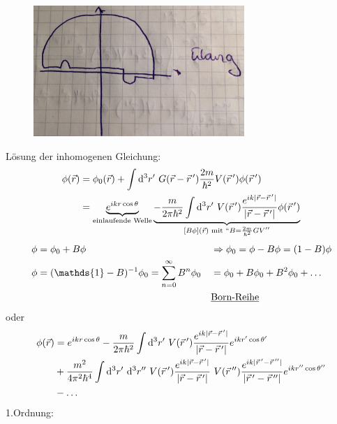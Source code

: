 	\begin{figure} [h]
		\begin{center}
			\includegraphics[width=8cm]{Born_Naeherung}
		\end{center}
	\end{figure}
	Lösung der inhomogenen Gleichung:
		\begin{align*}
			\phi(\vec{r}) &= \phi_0 (\vec{r}) + 
			\int \diff^3 r' ~G(\vec{r} - \vec{r}\,') \frac{2m}{\hbar^2} V(\vec{r}\,') \phi (\vec{r}\,') \\
			&= \underbrace{e^{ikr \cos \theta}}_{\substack{\text{einlaufende Welle}}}
			\underbrace{- \frac{m}{2 \pi \hbar^2} \int \diff^3 r' ~V(\vec{r}\,') 
			\frac{e^{ik |\vec{r} - \vec{r}\,'|}}{|\vec{r} - \vec{r}\,'|} \phi (\vec{r}\,')}_{\mathclap{[
				B\phi] (\vec{r}) \text{ mit } ``B=\frac{2m}{\hbar^2} GV''}} 
		\end{align*}
		\begin{align*}
			\phi &= \phi_0 + B \phi &
			&\Rightarrow \phi_0 = \phi - B \phi = (1 - B) \phi \\
			\phi &= (\mathds{1} - B)^{-1} \phi_0 = \sum_{n = 0}^{\infty} B^n \phi_0 &
			&= \phi_0 + B \phi_0 + B^2 \phi_0 + \ldots \\
			& & &\text{\underline{Born-Reihe}}
		\end{align*}
	oder
		\begin{align*}
			\phi (\vec{r}) &= e^{ikr \cos \theta}
			- \frac{m}{2 \pi \hbar^2} \int \mathrm{d}^3 r' ~V(\vec{r}\,') 
			\frac{e^{ik |\vec{r} - \vec{r}\,'|}}{|\vec{r} - \vec{r}\,'|}
			e^{ikr' \cos \theta'} \\
			&+ \frac{m^2}{4 \pi^2 \hbar^4} \int \mathrm{d}^3 r' ~\mathrm{d}^3 r'' 
			~V(\vec{r}\,') 
			\frac{e^{ik |\vec{r} - \vec{r}\,'|}}{|\vec{r} - \vec{r}\,'|}
			~V(\vec{r}\,'') 
			\frac{e^{ik |\vec{r}\,' - \vec{r}\,''|}}{|\vec{r}\,' - \vec{r}\,''|}
			e^{ikr'' \cos \theta''} \\
			&- \ldots
		\end{align*}
	1.Ordnung:
